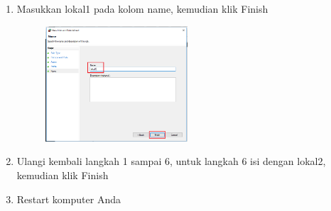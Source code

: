 \begin{enumerate}
	\item Masukkan lokal1 pada kolom name, kemudian klik Finish
		\begin{figure}[!htbp]
    		\centering
    		\includegraphics[width=0.5\textwidth]{figures/Xampp19.png}
    		\label{Xampp19}
		\end{figure}
		
	\item Ulangi kembali langkah 1 sampai 6, untuk langkah 6 isi dengan lokal2, kemudian klik Finish
	
	\item Restart komputer Anda 
\end{enumerate}